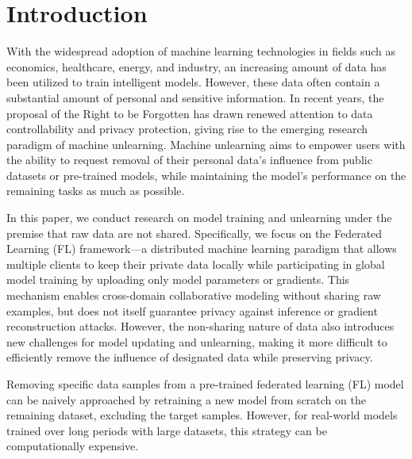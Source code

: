 \documentclass[software,article,submit,moreauthors]{Definitions/mdpi}
\begin{document}
\maketitle
\section{Introduction}


With the widespread adoption of machine learning technologies in fields such as
economics, healthcare, energy, and industry, an increasing amount of data has
been utilized to train intelligent models. However, these data often contain a
substantial amount of personal and sensitive information. In recent years, the
proposal of the Right to be Forgotten \cite{ref1} has drawn renewed attention to
data controllability and privacy protection, giving rise to the emerging
research paradigm of machine unlearning. Machine unlearning aims to empower
users with the ability to request removal of their personal data's influence
from public datasets or pre-trained models, while maintaining the model's
performance on the remaining tasks as much as possible.

In this paper, we conduct research on model training and unlearning under the
premise that raw data are not shared. Specifically, we focus on the Federated
Learning (FL) \cite{ref2,ref3,ref4,ref5,ref6,ref7} framework---a distributed
machine learning paradigm that allows multiple clients to keep their private
data locally while participating in global model training by uploading only
model parameters or gradients. This mechanism enables cross-domain collaborative modeling without sharing raw
examples, but does not itself guarantee privacy against inference or gradient
reconstruction attacks. However, the non-sharing nature of
data also introduces new challenges for model updating and unlearning, making it
more difficult to efficiently remove the influence of designated data while
preserving privacy.

Removing specific data samples from a pre-trained federated learning (FL) model
can be naively approached by retraining a new model from scratch on the
remaining dataset, excluding the target samples. However, for real-world models
trained over long periods with large datasets, this strategy can be
computationally expensive.
\end{document}
